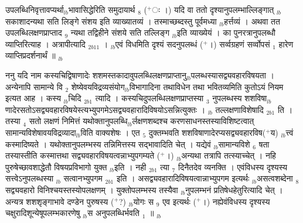 \documentclass[article,12pt,a4paper]{memoir}%
\newcommand{\add}[1]{($^{+}$#1)}
\newcounter{parCount}
\begin{document}
उपलब्धिनिवृत्तावप्यर्था{\tiny $_{lb}$}भावासिद्धेरिति समुदायार्थ {\tiny $_{8}$} \add{ः ।} यदि वा ततो दृश्यानुपलम्भाल्लिङ्गात् {\tiny $_{lb}$}सकाशादन्यथा सति लिङ्गे संशय इति व्याख्यातव्यं । तस्माच्छब्दस्तु पूर्वमध्या {\tiny $_{lb}$}हर्त्तव्यं । अथवा तत उपलब्धिलक्षणप्राप्ताद {\tiny $_{9}$} \leavevmode{} न्यथा तद्विहीने संशये सति तल्लिङ्ग {\tiny $_{lb}$}इति व्याख्येयं । का पुनरत्रानुपलब्धौ व्याप्तिरित्याह । {\color{DodgerBlue3}अत्रापीत्यादि} {\tiny $_{2b11}$} । {\tiny $_{lb}$}एवं विधमिति दृश्यं सदनुपलब्धं \add{।} सर्व्वग्रहणं सर्व्वोपसं {\tiny $_{1}$} हारेण व्याप्तिप्रदर्शनार्थं ॥
	{}
	\pend%
      {\tiny $_{lb}$}

	  
	  \pstart \leavevmode%
	ननु यदि नाम कस्यचिद्विषाणादेः शशमस्तकादावुपलब्धिलक्षणप्राप्तानु{\tiny $_{lb}$}पलब्धस्यासद्व्यवहारविषयता । अन्येनापि सामान्ये वि {\tiny $_{2}$} शेष्येवयविद्रव्यसंयोग{\tiny $_{lb}$}विभागादिना तथाविधेन तथा भवितव्यमिति कुतोऽयं नियम इत्यत आह । {\color{DodgerBlue3}कस्य} {\tiny $_{lb}$}चिदि {\tiny $_{2b1}$} त्यादि । कस्यचिदुपलब्धिलक्षणप्राप्तस्या {\tiny $_{3}$} नुपलब्धस्य शशविषा{\tiny $_{lb}$}णादेरसतोऽसद्व्यवहारविषयेस्त्यभ्युपगमेऽसद्व्यवहारादिविषयोऽसन्नित्युक्तः । {\tiny $_{lb}$} {\color{DodgerBlue3}तल्लक्षणाविशेषादि {\tiny $_{2b1}$} ति} । तस्या {\tiny $_{4}$} सतो लक्षणं निमित्तं यथोक्तानुपलब्धि{\tiny $_{lb}$}र्लक्षणशब्दश्च करणसाधनस्तस्याविशिष्टत्वात् सामान्यविशेषावयविद्रव्यादा{\tiny $_{lb}$}विति वाक्यशेषः । एत {\tiny $_{5}$} दुक्तम्भवति शशविषाणादेरप्यसद्व्यवहारविष\add{य} {\tiny $_{lb}$}त्त्वं कस्मादिष्यते । यथोक्तानुपलम्भस्य तन्निमित्तस्य सद्भावादिति चेत् । यद्येवं {\tiny $_{lb}$}सामान्यविशे {\tiny $_{6}$} षता तस्यास्तीति कस्मात्तथा सद्व्यवहारविषयत्वन्नाभ्युपगम्यते \add{।} {\tiny $_{lb}$}अन्यथा तत्रापि तत्स्याच्चेत् । नहि पुरुषेच्छावशाद्धेतौ विषयप्रविभागो युक्त {\tiny $_{lb}$}इति । {\color{DodgerBlue3}नही} {\tiny $_{2b1}$} त्या {\tiny $_{7}$} दिनैतदेव व्यनक्ति । एवंविधस्य दृश्यस्य सत्त्वेऽनुपलब्धस्या {\tiny $_{lb}$} {\color{DodgerBlue3}सत्वानभ्युपगम} {\tiny $_{2b1}$} इति । असद्व्यवहारादिविषयत्वान्नाभ्युपगम इत्यर्थः {\tiny $_{lb}$}असत्वशब्देना {\tiny $_{8}$} सद्व्यवहारो विनिश्चयस्तस्योपलक्षणम् । युक्तोपलम्भस्य तस्यैवा {\tiny $_{lb}$}नुपलम्भनं प्रतिषेधहेतुरित्यादि चेत् । अन्यत्र शशशृङ्गाभावे दण्डेन पुरुषस्य \add{?} {\tiny $_{lb}$}योगः स {\tiny $_{9}$} \leavevmode{} एव इत्यर्थः \add{।} नह्येवंविधस्य दृश्यस्य चक्षुरादिशून्येषूपलम्भकारणेषु {\tiny $_{lb}$}स अनुपलब्धिर्भवति {\tiny $_{1}$} ॥
	{}
	\pend%
      {\tiny $_{lb}$}
\end{document}
